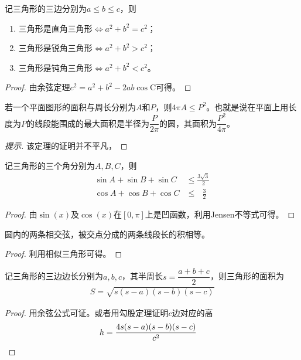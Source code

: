 \begin{theorem}[Pythagorean不等式]
  记三角形的三边分别为$a\le b\le c$，则
  \begin{enumerate}
  \item 三角形是直角三角形$\iff a^2+b^2=c^2$；
  \item 三角形是锐角三角形$\iff a^2+b^2>c^2$；
  \item 三角形是钝角三角形$\iff a^2+b^2<c^2$。
  \end{enumerate}
\end{theorem}
\begin{proof}
  由余弦定理$c^2=a^2+b^2-2ab\cos\mathrm{C}$可得。
\end{proof}


\begin{theorem}
  若一个平面图形的面积与周长分别为$A$和$P$，则$4\pi A\le P^2$。也就是说在平面上用长度为$P$的线段能围成的最大面积是半径为$\dfrac{P}{2\pi}$的圆，其面积为$\dfrac{P^2}{4\pi}$。
\end{theorem}
\begin{proof}[提示]
  该定理的证明并不平凡，
\end{proof}

\begin{theorem}
  记三角形的三个角分别为$A,B,C$，则
  \begin{align*}
    \sin A +\sin B + \sin C&\le\frac{3\sqrt3}{2}\\
    \cos A +\cos B + \cos C&\le\phantom{3}\,\frac{3}{2}
  \end{align*}
\end{theorem}
\begin{proof}
  由$\sin(x)$及$\cos(x)$在$[0,\pi]$上是凹函数，利用Jensen不等式可得。
\end{proof}

\begin{theorem}
  圆内的两条相交弦，被交点分成的两条线段长的积相等。
\end{theorem}
\begin{proof}
  利用相似三角形可得。
\end{proof}

\begin{theorem}
  记三角形的三边边长分别为$a,b,c$，其半周长$s=\dfrac{a+b+c}2$，则三角形的面积为
  \begin{align}
    S=\sqrt{s(s-a)(s-b)(s-c)}
  \end{align}
\end{theorem}
\begin{proof}
  用余弦公式可证。或者用勾股定理证明$c$边对应的高
  \begin{align*}
    h=\frac{4s(s-a)(s-b)(s-c)}{c^2} &\qedhere
  \end{align*}
\end{proof}

